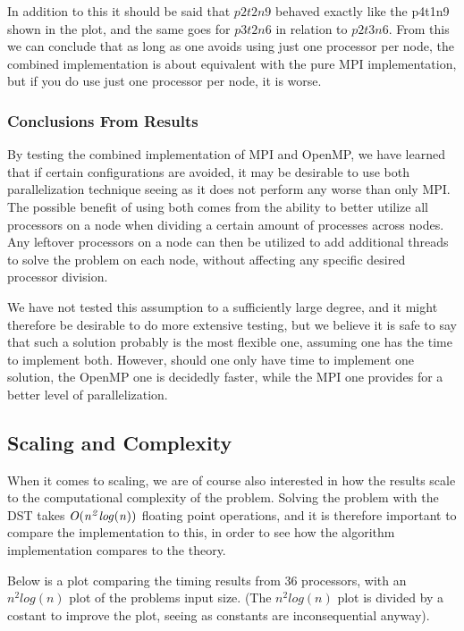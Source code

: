 \documentclass[fontsize=11pt,paper=a4,titlepage]{article}
\begin{document}
In addition to this it should be said that $p2t2n9$ behaved exactly like the
p4t1n9 shown in the plot, and the same goes for $p3t2n6$ in relation to
$p2t3n6$. From this we can conclude that as long as one avoids using just one
processor per node, the combined implementation is about equivalent with the
pure MPI implementation, but if you do use just one processor per node, it is
worse.

\subsubsection{Conclusions From Results}

By testing the combined implementation of MPI and OpenMP, we have learned that
if certain configurations are avoided, it may be desirable to use both
parallelization technique seeing as it does not perform any worse than only MPI.
The possible benefit of using both comes from the ability to better utilize all
processors on a node when dividing a certain amount of processes across nodes.
Any leftover processors on a node can then be utilized to add additional threads
to solve the problem on each node, without affecting any specific desired
processor division.

We have not tested this assumption to a sufficiently large degree, and it might
therefore be desirable to do more extensive testing, but we believe it is safe
to say that such a solution probably is the most flexible one, assuming one has
the time to implement both. However, should one only have time to implement one
solution, the OpenMP one is decidedly faster, while the MPI one provides for a
better level of parallelization.

\subsection{Scaling and Complexity} When it comes to scaling, we are of course
also interested in how the results scale to the computational complexity of the
problem. Solving the problem with the DST takes $\it O (n^2log(n))$ floating point
operations, and it is therefore important to compare the implementation to this,
in order to see how the algorithm implementation compares to the theory.

Below is a plot comparing the timing results from 36 processors, with an
$n^2log(n)$ plot of the problems input size. (The $n^2log(n)$ plot is divided by
a costant to improve the plot, seeing as constants are inconsequential anyway).
\end{document}

